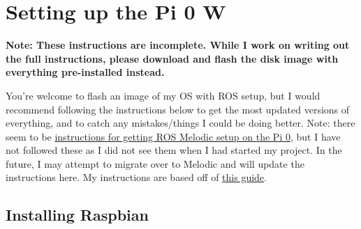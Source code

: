 \documentclass[11pt]{article}
\begin{document}
\section{Setting up the Pi 0 W}

\textbf{Note: These instructions are incomplete. While I work on writing out the full instructions, please download and flash the disk image with everything pre-installed instead.}

You're welcome to flash an image of my OS with ROS setup, but I would recommend following the instructions below to get the most updated versions of everything, and to catch any mistakes/things I could be doing better. Note: there seem to be \href{https://github.com/alansrobotlab/rospberrypi}{instructions for getting ROS Melodic setup on the Pi 0}, but I have not followed these as I did not see them when I had started my project. In the future, I may attempt to migrate over to Melodic and will update the instructions here. My instructions are based off of \href{https://chenzhongxian.gitbooks.io/learning-robotics-using-ros/content/installing_ros_indigo_on_the_raspberry_pi.html}{this guide}.

\subsection{Installing Raspbian}
\end{document}
